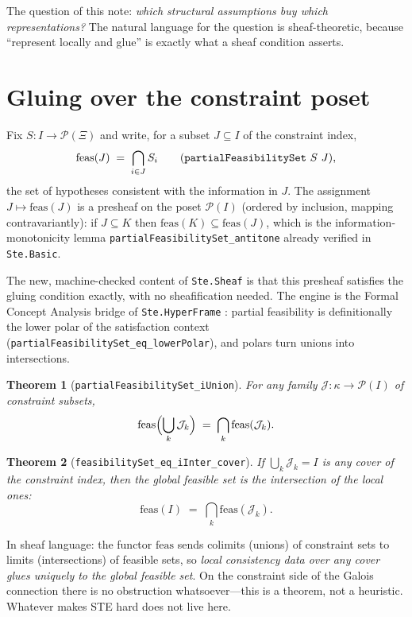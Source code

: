 \documentclass[11pt]{article}
\newtheorem{theorem}{Theorem}
\newcommand{\lean}[1]{\texttt{#1}}
\newcommand{\feas}{\mathrm{feas}}
\newcommand{\Xii}{\Xi}
\begin{document}
The question of this note: \emph{which structural assumptions buy which
representations?}  The natural language for the question is
sheaf-theoretic, because ``represent locally and glue'' is exactly what
a sheaf condition asserts.

\section{Gluing over the constraint poset}

Fix $S : I \to \mathcal{P}(\Xii)$ and write, for a subset
$J \subseteq I$ of the constraint index,
\[
  \feas(J) \;=\; \bigcap_{i \in J} S_i
  \qquad (\text{\lean{partialFeasibilitySet}~$S$~$J$}),
\]
the set of hypotheses consistent with the information in $J$.  The
assignment $J \mapsto \feas(J)$ is a presheaf on the poset
$\mathcal{P}(I)$ (ordered by inclusion, mapping contravariantly): if
$J \subseteq K$ then $\feas(K) \subseteq \feas(J)$, which is the
information-monotonicity lemma
\lean{partialFeasibilitySet\_antitone} already verified in
\lean{Ste.Basic}.

The new, machine-checked content of \lean{Ste.Sheaf} is that this
presheaf satisfies the gluing condition exactly, with no sheafification
needed.  The engine is the Formal Concept Analysis bridge of
\lean{Ste.HyperFrame} \citep{ganter1999fca}: partial feasibility is
definitionally the lower polar of the satisfaction context
(\lean{partialFeasibilitySet\_eq\_lowerPolar}), and polars turn unions
into intersections.

\begin{theorem}[\lean{partialFeasibilitySet\_iUnion}]
For any family $\mathcal{J} : \kappa \to \mathcal{P}(I)$ of constraint
subsets,
\[
  \feas\Bigl(\bigcup_{k} \mathcal{J}_k\Bigr)
  \;=\; \bigcap_{k} \feas(\mathcal{J}_k).
\]
\end{theorem}

\begin{theorem}[\lean{feasibilitySet\_eq\_iInter\_cover}]
If $\bigcup_k \mathcal{J}_k = I$ is any cover of the constraint index,
then the global feasible set is the intersection of the local ones:
\[
  \feas(I) \;=\; \bigcap_{k} \feas(\mathcal{J}_k).
\]
\end{theorem}

In sheaf language: the functor $\feas$ sends colimits (unions) of
constraint sets to limits (intersections) of feasible sets, so
\emph{local consistency data over any cover glues uniquely to the
global feasible set}.  On the constraint side of the Galois connection
there is no obstruction whatsoever---this is a theorem, not a
heuristic.  Whatever makes STE hard does not live here.
\end{document}
